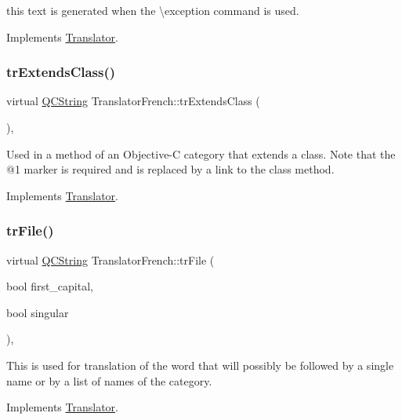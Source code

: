 this text is generated when the \textbackslash{}exception command is used. 

Implements \mbox{\hyperlink{class_translator}{Translator}}.

\mbox{\label{class_translator_french_a056f7dfd4e581549131e77785da6d8a4}} 
\subsubsection{\texorpdfstring{trExtendsClass()}{trExtendsClass()}}
{\footnotesize\ttfamily virtual \mbox{\hyperlink{class_q_c_string}{Q\+C\+String}} Translator\+French\+::tr\+Extends\+Class (\begin{DoxyParamCaption}{ }\end{DoxyParamCaption})\hspace{0.3cm}{\ttfamily [inline]}, {\ttfamily [virtual]}}

Used in a method of an Objective-\/C category that extends a class. Note that the @1 marker is required and is replaced by a link to the class method. 

Implements \mbox{\hyperlink{class_translator}{Translator}}.

\mbox{\label{class_translator_french_a0199dae1962feb5b031edc87535e0ec2}} 
\subsubsection{\texorpdfstring{trFile()}{trFile()}}
{\footnotesize\ttfamily virtual \mbox{\hyperlink{class_q_c_string}{Q\+C\+String}} Translator\+French\+::tr\+File (\begin{DoxyParamCaption}\item[{bool}]{first\+\_\+capital,  }\item[{bool}]{singular }\end{DoxyParamCaption})\hspace{0.3cm}{\ttfamily [inline]}, {\ttfamily [virtual]}}

This is used for translation of the word that will possibly be followed by a single name or by a list of names of the category. 

Implements \mbox{\hyperlink{class_translator}{Translator}}.

